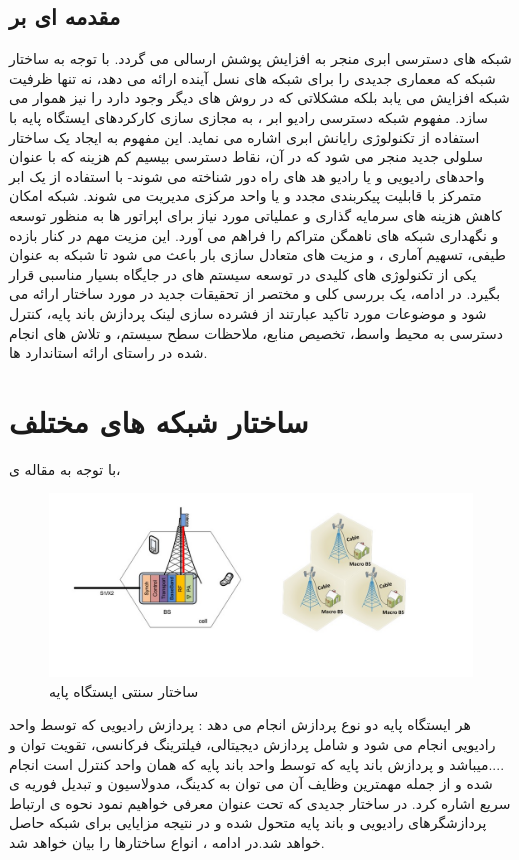 \subsection{مقدمه ای بر }
شبکه های دسترسی ابری منجر به افزایش پوشش ارسالی می گردد. با توجه به ساختار شبکه
    که معماری جدیدی را برای شبکه های نسل آینده
ارائه می دهد، نه تنها ظرفیت شبکه افزایش می یابد بلکه
مشکلاتی که در روش های دیگر وجود دارد را نیز هموار
می سازد.
مفهوم شبکه دسترسی رادیو ابر ، به مجازی سازی کارکردهای ایستگاه  پایه  با استفاده از تکنولوژی رایانش ابری  اشاره می نماید. این مفهوم به ایجاد یک ساختار سلولی جدید منجر می شود که در آن، نقاط دسترسی بیسیم کم هزینه که با عنوان واحدهای رادیویی  و یا رادیو هد های
  راه دور 
 شناخته می شوند- با استفاده از یک ابر متمرکز با قابلیت پیکربندی مجدد و یا واحد مرکزی  مدیریت می شوند. شبکه امکان کاهش هزینه های سرمایه گذاری و عملیاتی مورد نیاز برای اپراتور ها به منظور توسعه و نگهداری شبکه های ناهمگن متراکم را فراهم می آورد. این مزیت مهم در کنار بازده طیفی، تسهیم آماری ، و مزیت های متعادل سازی بار باعث می شود تا شبکه  به عنوان یکی از تکنولوژی های کلیدی در توسعه سیستم های  در جایگاه بسیار مناسبی قرار بگیرد. در ادامه، یک بررسی کلی و مختصر از تحقیقات جدید در مورد ساختار  ارائه می شود و موضوعات مورد تاکید عبارتند از فشرده سازی لینک  پردازش باند پایه، کنترل دسترسی به محیط واسط، تخصیص منابع، ملاحظات سطح سیستم، و تلاش های انجام شده در راستای ارائه استاندارد ها.
\section{ساختار شبکه های مختلف }
با توجه به مقاله ی\cite{checko2015cloud}،
\begin{figure}
  \centering
    \includegraphics[scale=0.7]{./pic1/c11}
  \caption{ساختار سنتی ایستگاه پایه \cite{checko2015cloud}}
  \label{fig:c11}
\end{figure}
هر ایستگاه پایه دو نوع پردازش انجام می دهد : پردازش
رادیویی که توسط واحد رادیویی  انجام می شود و شامل پردازش
دیجیتالی، فیلترینگ فرکانسی، تقویت توان و ....میباشد و
پردازش باند پایه که توسط واحد باند پایه  که همان واحد کنترل است  انجام شده و از جمله
مهمترین وظایف آن می توان به کدینگ، مدولاسیون و
تبدیل فوریه ی سریع اشاره کرد. در ساختار جدیدی که
تحت عنوان   معرفی خواهیم نمود نحوه ی ارتباط
پردازشگرهای رادیویی و باند پایه متحول شده و در نتیجه
مزایایی برای شبکه حاصل خواهد شد.در ادامه ، انواع ساختارها را بیان خواهد شد.

